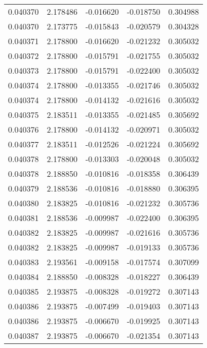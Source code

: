 \begin{tabular}{lrrrr}
0.040370    &  2.178486 & -0.016620 & -0.018750 &             0.304988 \\
0.040370    &  2.173775 & -0.015843 & -0.020579 &             0.304328 \\
0.040371    &  2.178800 & -0.016620 & -0.021232 &             0.305032 \\
0.040372    &  2.178800 & -0.015791 & -0.021755 &             0.305032 \\
0.040373    &  2.178800 & -0.015791 & -0.022400 &             0.305032 \\
0.040374    &  2.178800 & -0.013355 & -0.021746 &             0.305032 \\
0.040374    &  2.178800 & -0.014132 & -0.021616 &             0.305032 \\
0.040375    &  2.183511 & -0.013355 & -0.021485 &             0.305692 \\
0.040376    &  2.178800 & -0.014132 & -0.020971 &             0.305032 \\
0.040377    &  2.183511 & -0.012526 & -0.021224 &             0.305692 \\
0.040378    &  2.178800 & -0.013303 & -0.020048 &             0.305032 \\
0.040378    &  2.188850 & -0.010816 & -0.018358 &             0.306439 \\
0.040379    &  2.188536 & -0.010816 & -0.018880 &             0.306395 \\
0.040380    &  2.183825 & -0.010816 & -0.021232 &             0.305736 \\
0.040381    &  2.188536 & -0.009987 & -0.022400 &             0.306395 \\
0.040382    &  2.183825 & -0.009987 & -0.021616 &             0.305736 \\
0.040382    &  2.183825 & -0.009987 & -0.019133 &             0.305736 \\
0.040383    &  2.193561 & -0.009158 & -0.017574 &             0.307099 \\
0.040384    &  2.188850 & -0.008328 & -0.018227 &             0.306439 \\
0.040385    &  2.193875 & -0.008328 & -0.019272 &             0.307143 \\
0.040386    &  2.193875 & -0.007499 & -0.019403 &             0.307143 \\
0.040386    &  2.193875 & -0.006670 & -0.019925 &             0.307143 \\
0.040387    &  2.193875 & -0.006670 & -0.021354 &             0.307143 \\

\end{tabular}
